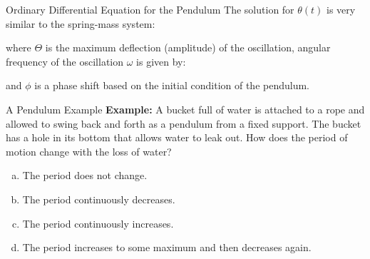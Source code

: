\documentclass[12pt,compress,aspectratio=169]{beamer}
\newcommand{\eq}[2]{\vspace{#1}{\Large\begin{displaymath}#2\end{displaymath}}}
\begin{document}
\begin{frame}{Ordinary Differential Equation for the Pendulum}
  The solution for $\theta(t)$ is very similar to the spring-mass system:

    \eq{-.2in}{
      \boxed{\theta(t)=\Theta\cos(\omega t-\phi)}
    }

    where $\Theta$ is the maximum deflection (amplitude) of the oscillation,
    angular frequency of the oscillation $\omega$ is given by:
    
    \eq{-.15in}{
      \boxed{\omega=\sqrt{\frac{g}{L}}}
    }

    and $\phi$ is a phase shift based on the initial condition of the pendulum.
\end{frame}






\begin{frame}{A Pendulum Example}
  \textbf{Example:} A bucket full of water is attached to a rope and allowed
  to swing back and forth as a pendulum from a fixed support. The bucket has a
  hole in its bottom that allows water to leak out. How does the period of
  motion change with the loss of water?
  \begin{enumerate}[(a)]
  \item The period does not change.
  \item The period continuously decreases.
  \item The period continuously increases.
  \item The period increases to some maximum and then decreases again.
  \end{enumerate}
\end{frame}
\end{document}
